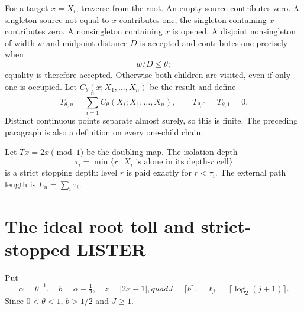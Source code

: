 \documentclass[11pt]{article}
\numberwithin{equation}{section}
\theoremstyle{definition}\newtheorem{definition}[theorem]{Definition}
\theoremstyle{remark}\newtheorem{remark}[theorem]{Remark}
\newcommand{\1}{\mathbf 1}\newcommand{\cD}{\mathcal D}
\begin{document}
For a target $x=X_i$, traverse from the root.  An empty source contributes
zero.  A singleton source not equal to $x$ contributes one; the singleton
containing $x$ contributes zero.  A nonsingleton containing $x$ is opened.
A disjoint nonsingleton of width $w$ and midpoint distance $D$ is accepted
and contributes one precisely when
\begin{equation}w/D\le\theta;                                      \label{eq:accept}
\end{equation}
equality is therefore accepted.  Otherwise both children are visited,
even if only one is occupied.  Let $C_\theta(x;X_1,\ldots,X_n)$ be the
result and define
\begin{equation}T_{\theta,n}=\sum_{i=1}^nC_\theta(X_i;X_1,\ldots,X_n),
 \qquad T_{\theta,0}=T_{\theta,1}=0.                         \label{eq:Tdef}
\end{equation}
Distinct continuous points separate almost surely, so this is finite.
The preceding paragraph is also a definition on every one-child chain.

Let $T x=2x\pmod1$ be the doubling map.  The isolation depth
\begin{equation}\tau_i=\min\{r:\ X_i\text{ is alone in its depth-$r$ cell}\}
                                                                  \label{eq:isolation}
\end{equation}
is a strict stopping depth: level $r$ is paid exactly for $r<\tau_i$.
The external path length is $L_n=\sum_i\tau_i$.

\clearpage
\section{The ideal root toll and strict-stopped LISTER}\label{sec:toll}
Put
\begin{equation}\alpha=\theta^{-1},\quad b=\alpha-\tfrac12,
 \quad z=|2x-1|,quad J=\lceil b\rceil,
 \quad \ell_j=\lceil\log_2(j+1)\rceil.                        \label{eq:parameters}
\end{equation}
Since $0<\theta<1$, $b>1/2$ and $J\ge1$.
\end{document}
